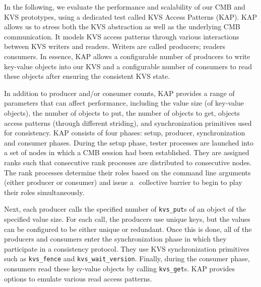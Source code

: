 In the following, we evaluate the performance and scalability
of our CMB and KVS prototypes,
using
a dedicated test called KVS Access Patterns (KAP).
KAP allows us to stress both the KVS abstraction 
as well as the underlying CMB communication.
It models KVS access patterns through various interactions
between KVS writers and readers. Writers are called producers;
readers consumers.
In essence, KAP allows a configurable number of producers
to write key-value objects into our KVS 
and a configurable number of consumers to read these
objects after ensuring the consistent KVS state.

In addition to producer and/or consumer counts,
KAP provides a range of parameters that can affect performance, including
the value size (of key-value objects),
the number of objects to put,
the number of objects to get, objects access 
patterns (through different striding), and
synchronization primitives used for consistency.
KAP consists of four phases: setup, producer, synchronization 
and consumer phases. 
During the setup phase, tester processes are launched 
into a set of nodes in which a CMB session had been established.
They are assigned ranks such that consecutive rank
processes are distributed to consecutive nodes.
The rank processes determine their roles based
on the command line arguments (either producer or consumer) and issue a
\flux\ collective barrier to begin to play their roles
simultaneously.

Next, each producer calls the specified number of
{\tt kvs\_put}s of an object of the specified value size.
For each call, the producers use unique keys, but
the values can be configured to be either unique
or redundant.
Once this is done, all of the producers and consumers
enter the synchronization phase in which they 
participate in a consistency protocol. They use
KVS synchronization primitives such as {\tt kvs\_fence}
and {\tt kvs\_wait\_version}.
Finally, during the consumer phase, consumers read
these key-value objects by calling {\tt kvs\_get}s.
KAP provides options to emulate various read access
patterns.


